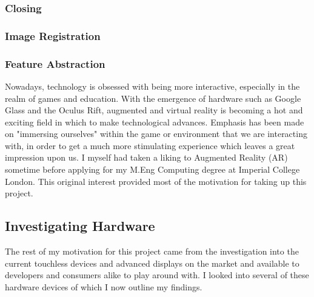 \documentclass[11pt]{report}
\begin{document}
\subsubsection*{Closing}


\subsubsection*{Image Registration}
\subsubsection*{Feature Abstraction}








Nowadays, technology is obsessed with being more interactive, especially in 
the realm of games and education. With the emergence of hardware such as
Google Glass and the Oculus Rift, augmented and virtual reality is becoming
a hot and exciting field in which to make technological advances. Emphasis
has been made on "immersing ourselves" within the game or environment that
we are interacting with, in order to get a much more stimulating experience
which leaves a great impression upon us. I myself had taken a liking to 
Augmented Reality (AR) sometime before applying for my M.Eng Computing degree
at Imperial College London. This original interest provided most of the 
motivation for taking up this project.

\subsection*{Investigating Hardware}
The rest of my motivation for this project came from the investigation into 
the current touchless devices and advanced displays on the market and 
available to developers and consumers alike to play around with. I looked 
into several of these hardware devices of which I now outline my findings.
 
\end{document}
